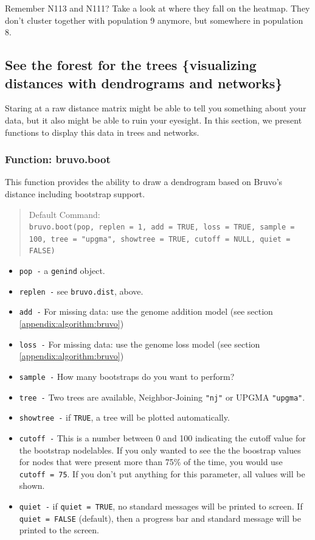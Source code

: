 \documentclass[letterpaper]{article}
\newcommand{\tab}{\hspace*{1em}}
\begin{document}
Remember N113 and N111? Take a look at where they fall on the heatmap. They don't cluster together with population 9 anymore, but somewhere in population 8.

\subsection{See the forest for the trees \{visualizing distances with dendrograms and networks\}}\label{index:trees}

\tab\tab Staring at a raw distance matrix might be able to tell you something about your data, but it also might be able to ruin your eyesight. In this section, we present functions to display this data in trees and networks. 

\subsubsection{Function: bruvo.boot}\label{index:trees:bruvo.boot}

\tab\tab This function provides the ability to draw a dendrogram based on Bruvo's distance including bootstrap support. 
\begin{quote}
Default Command:\\
\texttt{bruvo.boot(pop, replen = 1, add = TRUE, loss = TRUE, sample = 100, tree = "upgma", showtree = TRUE, cutoff = NULL, quiet = FALSE)}
\end{quote}
\begin{itemize}
  \item \texttt{pop -} a \texttt{genind} object.
  \item \texttt{replen -} see \texttt{bruvo.dist}, above.
  \item \texttt{add -} For missing data: use the genome addition model (see section \ref{appendix:algorithm:bruvo})
  \item \texttt{loss -} For missing data: use the genome loss model (see section \ref{appendix:algorithm:bruvo})
  \item \texttt{sample -} How many bootstraps do you want to perform? 
  \item \texttt{tree -} Two trees are available, Neighbor-Joining \texttt{"nj"} or UPGMA \texttt{"upgma"}.
  \item \texttt{showtree -} if \texttt{TRUE}, a tree will be plotted automatically.
  \item \texttt{cutoff -} This is a number between 0 and 100 indicating the cutoff value for the bootstrap nodelables. If you only wanted to see the the boostrap values for nodes that were present more than 75\% of the time, you would use \texttt{cutoff = 75}. If you don't put anything for this parameter, all values will be shown.
  \item \texttt{quiet -} if \texttt{quiet = TRUE}, no standard messages will be printed to screen. If \texttt{quiet = FALSE} (default), then a progress bar and standard message will be printed to the screen.
\end{itemize}
\end{document}
